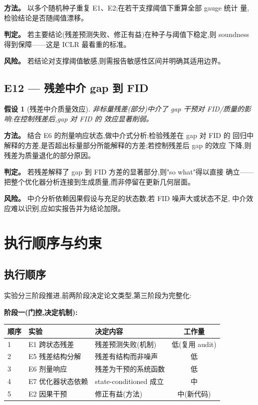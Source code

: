 \documentclass[UTF8,11pt,a4paper]{ctexart}
\newtheorem{hypothesis}{假设}[section]
\begin{document}
\textbf{方法。} 以多个随机种子重复 E1、E2;在若干支撑阈值下重算全部 gauge 统计
量,检验结论是否随阈值漂移。

\textbf{判定。} 若主要结论(残差预测失败、修正有益)在种子与阈值下稳定,则
soundness 得到保障——这是 ICLR 最看重的标准。

\textbf{风险。} 若结论对支撑阈值敏感,则需报告敏感性区间并明确其适用边界。

\subsection{E12 --- 残差中介 gap 到 FID}
\begin{hypothesis}[残差中介质量效应]
\label{hyp:E12}
非标量残差(部分)中介了 gap 干预对 FID/质量的影响:在控制残差后,gap 对 FID 的
效应显著削弱。
\end{hypothesis}

\textbf{方法。} 结合 E6 的剂量响应状态,做中介式分析:检验残差在 gap 对 FID 的
回归中解释的方差,是否超出标量部分所能解释的方差;若控制残差后 gap 的效应
下降,则残差为质量退化的部分原因。

\textbf{判定。} 若残差解释了 gap 到 FID 方差的显著部分,则"so what"得以直接
确立——把整个优化器分析连接到生成质量,而非停留在更新几何层面。

\textbf{风险。} 中介分析依赖因果假设与充足的状态数;若 FID 噪声大或状态不足,
中介效应难以识别,应如实报告并为结论加限。

\section{执行顺序与约束}
\label{sec:exec}

\subsection{执行顺序}
实验分三阶段推进,前两阶段决定论文类型,第三阶段为完整化:

\textbf{阶段一(门控,决定机制):}
\begin{center}
\begin{tabular}{@{}lllc@{}}
\toprule
顺序 & 实验 & 决定内容 & 工作量 \\
\midrule
1 & E1 跨状态残差 & 残差预测失败(机制) & 低(复用 audit) \\
2 & E5 残差结构分解 & 残差有结构而非噪声 & 低 \\
3 & E6 剂量响应 & 残差为干预的系统函数 & 低 \\
4 & E7 优化器状态依赖 & state-conditioned 成立 & 中 \\
5 & E2 因果干预 & 修正有益(方法) & 中(新代码) \\
\bottomrule
\end{tabular}
\end{center}
\end{document}
